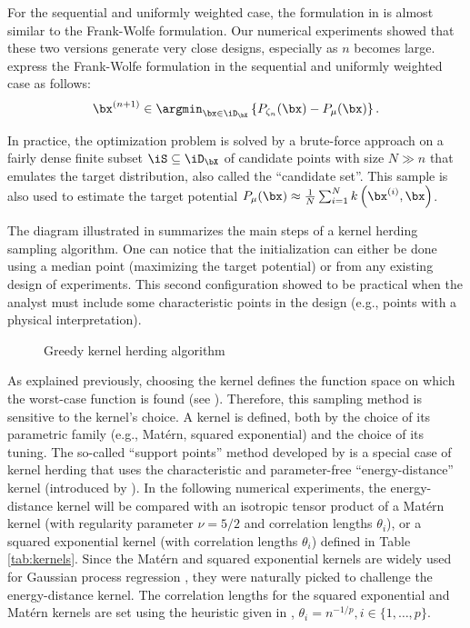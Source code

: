 \medskip
\begin{remark}
For the sequential and uniformly weighted case, the formulation in  is almost similar to the Frank-Wolfe formulation. 
Our numerical experiments showed that these two versions generate very close designs, especially as $n$ becomes large. 
\cite{pronzato_rendas_2021} express the Frank-Wolfe formulation in the sequential and uniformly weighted case as follows:
\begin{align}
   \bx^{(n+1)} \in \argmin_{\bx \in \iD_{\bX}} \left\{P_{\zeta_n}(\bx) - P_{\mu}(\bx)\right\}.
   \label{eq:kh_criterion}
\end{align}
\end{remark}
\smallskip

\begin{remark}
In practice, the optimization problem is solved by a brute-force approach on a fairly dense finite subset $\iS\subseteq\iD_{\bX}$ of candidate points with size $N \gg n$ that emulates the target distribution, also called the ``candidate set''. 
This sample is also used to estimate the target potential $P_\mu(\bx) \approx \frac1N \sum_{i=1}^N k\left(\bx^{(i)}, \bx\right)$.
\end{remark}
\medskip

The diagram illustrated in  summarizes the main steps of a kernel herding sampling algorithm. 
One can notice that the initialization can either be done using a median point (maximizing the target potential) or from any existing design of experiments. 
This second configuration showed to be practical when the analyst must include some characteristic points in the design (e.g., points with a physical interpretation). 

\begin{figure}[ht!]
    \centering
    
    \caption{Greedy kernel herding algorithm}
    \label{fig:kh_algo}
\end{figure}

As explained previously, choosing the kernel defines the function space on which the worst-case function is found (see ). 
Therefore, this sampling method is sensitive to the kernel's choice. 
A kernel is defined, both by the choice of its parametric family (e.g., Matérn, squared exponential) and the choice of its tuning. 
The so-called ``support points'' method developed by \cite{mak_joseph_2018} is a special case of kernel herding that uses the characteristic and parameter-free ``energy-distance'' kernel (introduced by \cite{szekely_rizzo_2013}). 
In the following numerical experiments, the energy-distance kernel will be compared with an isotropic tensor product of a Matérn kernel (with regularity parameter $\nu = 5/2$ and correlation lengths $\theta_i$), or a squared exponential kernel (with correlation lengths $\theta_i$) defined in Table \ref{tab:kernels}. 
Since the Matérn and squared exponential kernels are widely used for Gaussian process regression \citep{rasmussen_2006}, they were naturally picked to challenge the energy-distance kernel. 
The correlation lengths for the squared exponential and Matérn kernels are set using the heuristic given in \cite{fekhari_iooss_2023}, $\theta_i = n^{-1/p}, i \in \{1, \dots, p\}$. 

